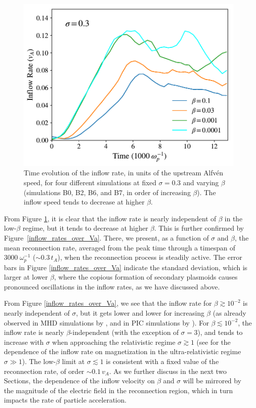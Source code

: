 \begin{figure}[!h]
	\centering
{
\includegraphics[width=\linewidth]{sigpoint3_inflow_rates.pdf}
\caption{\label{sigpoint3_inflow_rates}Time evolution of the inflow rate, in units of the upstream Alfv\'en speed, for four different simulations at fixed $\sigma=0.3$ and varying $\beta$ (simulations B0, B2, B6, and B7, in order of increasing $\beta$).  The inflow speed tends to decrease at higher $\beta$.}
}
\end{figure}

From  Figure \ref{sigpoint3_inflow_rates}, it is clear that the inflow rate is nearly independent of $\beta$ in the low-$\beta$ regime, but it tends to decrease at higher $\beta$. This is further confirmed by Figure~\ref{inflow_rates_over_Va}. There, we present, as a function of $\sigma$ and $\beta$, the mean reconnection rate, averaged from the peak time through a timespan of $3000 \; \omega_{p}^{-1}$ ($\sim 0.3 \,t_{A}$), when the reconnection process is  steadily active. The error bars in Figure \ref{inflow_rates_over_Va} indicate the standard deviation, which is larger at lower $\beta$, where the copious formation of secondary plasmoids causes pronounced oscillations in the inflow rates, as we have discussed above.

From Figure \ref{inflow_rates_over_Va}, we see that the inflow rate for $\beta\gtrsim 10^{-2}$ is nearly independent of $\sigma$, but it gets lower and lower for increasing $\beta$ (as already observed in MHD simulations by \citealt{ni2012}, and in PIC simulations by \citealt{rowan2017}). For $\beta\lesssim 10^{-2}$, the inflow rate is nearly $\beta$-independent (with the exception of $\sigma=3$), and tends to increase with $\sigma$ when approaching the relativistic regime $\sigma\gtrsim 1$ (see  \citealt{sironi2016} for the dependence of the inflow rate on magnetization in the ultra-relativistic regime $\sigma\gg1$). The low-$\beta$ limit at $\sigma\lesssim1$ is consistent with a fixed value of the reconnection rate, of order $\sim 0.1\,v_{A}$. 
As we further discuss in the next two Sections, the dependence of the inflow velocity on $\beta$ and $\sigma$ will be mirrored by the magnitude of the electric field in the reconnection region, which in turn impacts the rate of particle acceleration.

